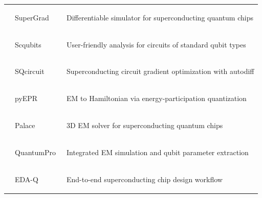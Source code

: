 \documentclass[a4paper,onecolumn,11pt,unpublished]{quantumarticle}
\begin{document}
\begin{table}[!ht]
\begin{tabular}{P{1.55cm}|P{2.6cm}|L{9.6cm}}
    & SuperGrad~\cite{Wang2025SuperGrad}
    & \begin{tightitemize}
        \item Differentiable simulator for superconducting quantum chips
      \end{tightitemize}
    \\ 
    
    & Scqubits~\cite{Groszkowski2021Scqubits, Chitta2022Computeraided}
    & \begin{tightitemize}
        \item User-friendly analysis for circuits of standard qubit types
      \end{tightitemize}
    \\ 
    
    & SQcircuit~\cite{Rajabzadeh2023Analysis}
    & \begin{tightitemize}
        \item Superconducting circuit gradient optimization with autodiff
      \end{tightitemize}
    \\ 
    
    & pyEPR~\cite{Minev2021pyEPR}
    & \begin{tightitemize}
        \item EM to Hamiltonian via energy-participation quantization
      \end{tightitemize}
    \\ 
    
    & Palace~\cite{Grimberg2023Palace}
    & \begin{tightitemize}
        \item 3D EM solver for superconducting quantum chips
      \end{tightitemize}
    \\ 
    
    & QuantumPro~\cite{QuantumPro}
    & \begin{tightitemize}
        \item Integrated EM simulation and qubit parameter extraction
      \end{tightitemize}
    \\ 
    
    & EDA-Q~\cite{Zhao2025EDAQ}
    & \begin{tightitemize}
        \item End-to-end superconducting chip design workflow
      \end{tightitemize}
    \\ 
    

\end{tabular}
\end{table}
\end{document}
